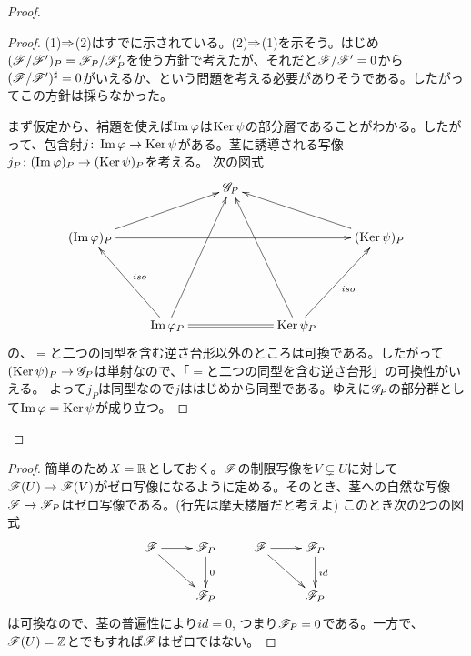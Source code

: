 \begin{proof}
  \begin{proof}
    (1)$\Rightarrow$(2)はすでに示されている。(2)$\Rightarrow$(1)を示そう。はじめ$(\mathscr{F} / \mathscr{F}')_P = \mathscr{F}_P / \mathscr{F}'_P$を使う方針で考えたが、それだと$\mathscr{F} / \mathscr{F}' = 0$から$(\mathscr{F} / \mathscr{F}')^{\sharp} = 0$がいえるか、という問題を考える必要がありそうである。したがってこの方針は採らなかった。

    まず仮定から、補題を使えば$\operatorname{Im} {\varphi}$は$\operatorname{Ker} \psi$の部分層であることがわかる。したがって、包含射$j \colon \operatorname{Im} {\varphi} \to \operatorname{Ker} \psi$がある。茎に誘導される写像$j_P \colon (\operatorname{Im} {\varphi})_P \to (\operatorname{Ker} \psi)_P$を考える。
  次の図式
  \[
  \xymatrix{
  {} & {} & \scrg_P & {} & { } \\
  (\Im \vp)_P \ar[urr] \ar[rrrr]  & {} & {} & {} & (\Ker \psi )_P \ar[llu] \\
  {} & {} & {} & {} & {} \\
  {} & \Im \vp_P \ar[luu]_-{iso} \ar@{=}[rr] \ar[uuur] &  { } & \Ker \psi_P \ar[luuu] \ar[uur]_-{iso}
   }
  \]
  の、$=$と二つの同型を含む逆さ台形以外のところは可換である。したがって$(\operatorname{Ker} \psi)_P \to \mathscr{G}_P$は単射なので、「$=$と二つの同型を含む逆さ台形」の可換性がいえる。
  よって$j_P$は同型なので$j$ははじめから同型である。ゆえに$\mathscr{G}_P$の部分群として$\operatorname{Im} {\varphi} = \operatorname{Ker} \psi$が成り立つ。
\end{proof}

\end{proof}



\begin{proof}
  簡単のため$X = {\mathbb R}$としておく。$\mathscr{F}$の制限写像を$V \subsetneq U$に対して$\mathscr{F}(U) \to \mathscr{F}(V)$がゼロ写像になるように定める。そのとき、茎への自然な写像$\mathscr{F} \to \mathscr{F}_P$はゼロ写像である。(行先は摩天楼層だと考えよ) このとき次の2つの図式
  \[
  \xymatrix{
\scrf \ar[r] \ar[dr] & \scrf_P \ar[d]^0 & \scrf \ar[r] \ar[rd] & \scrf_P  \ar[d]^{id} \\
{} & \scrf_P & {} & \scrf_P
  }
  \]
  は可換なので、茎の普遍性により$id = 0$, つまり$\mathscr{F}_P = 0$である。一方で、$\mathscr{F}(U) = {\mathbb Z}$とでもすれば$\mathscr{F}$はゼロではない。
\end{proof}



